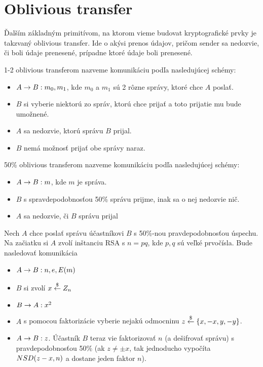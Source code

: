 \section{Oblivious transfer}

Ďalším základným primitívom, na ktorom vieme budovat kryptografické
prvky je takzvaný oblivious transfer. Ide o akýsi prenos údajov,
pričom sender sa nedozvie, či boli údaje prenesené, prípadne ktoré
údaje boli prenesené.

\begin{definicia}[1-2 OT]
    1-2 oblivious transferom nazveme komunikáciu podľa nasledujúcej
    schémy:
    \begin{itemize}
        \item $A \rightarrow B: m_0, m_1$, kde $m_0$ a $m_1$ sú 2 rôzne
        správy, ktoré chce $A$ poslať.
        \item $B$ si vyberie niektorú zo správ, ktorú chce prijať a
        toto prijatie mu bude umožnené.
        \item $A$ sa nedozvie, ktorú správu $B$ prijal.
        \item $B$ nemá možnosť prijať obe správy naraz.        
    \end{itemize}
\end{definicia}

\begin{definicia}[50\% OT]
    50\% oblivious transferom nazveme komunikáciu podľa nasledujúcej
    schémy:
    \begin{itemize}
        \item $A \rightarrow B: m$, kde $m$ je správa.
        \item $B$ s spravdepodobnosťou 50\% správu prijme, inak sa o
        nej nedozvie nič.
        \item $A$ sa nedozvie, či $B$ správu prijal
    \end{itemize}
\end{definicia}

\begin{priklad}[Realizácia 50\% OT]
    Nech $A$ chce poslať správu účastníkovi $B$ s 50\%-nou
    pravdepodobnosťou úspechu. Na začiatku si $A$ zvolí inštanciu RSA
    s $n=pq$, kde $p,q$ sú veľké prvočísla. Bude nasledovať
    komunikácia
 \begin{itemize}
    \compactlist
    \item $A \rightarrow B: n,e,E(m)$ 
    \item $B$ si zvolí $x \overset{\$}{\leftarrow} Z_n$
    \item $B \rightarrow A: x^2$
    \item $A$ s pomocou faktorizácie vyberie nejakú odmocninu
        $z \overset{\$}{\leftarrow} \{x,-x,y,-y\}$.
    \item $A \rightarrow B: z$.
    Účastník $B$ teraz vie faktorizovať $n$ (a dešifrovať správu) s
    pravdepodobnosťou 50\% (ak $z \ne \pm x$, tak jednoducho
    vypočíta $NSD(z-x, n)$ a dostane jeden faktor $n$).
 \end{itemize} 
\end{priklad}

